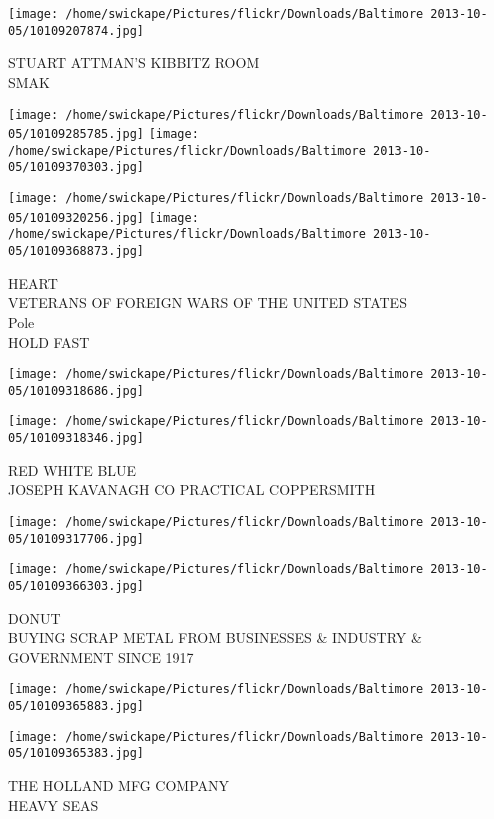 \documentclass[10pt,letterpaper]{article}
\begin{document}
\vspace{0.25in}
\texttt{[image: /home/swickape/Pictures/flickr/Downloads/Baltimore 2013-10-05/10109207874.jpg]}

STUART ATTMAN'S KIBBITZ ROOM\\
SMAK
\pagebreak

\texttt{[image: /home/swickape/Pictures/flickr/Downloads/Baltimore 2013-10-05/10109285785.jpg]}
\texttt{[image: /home/swickape/Pictures/flickr/Downloads/Baltimore 2013-10-05/10109370303.jpg]}

\texttt{[image: /home/swickape/Pictures/flickr/Downloads/Baltimore 2013-10-05/10109320256.jpg]}
\texttt{[image: /home/swickape/Pictures/flickr/Downloads/Baltimore 2013-10-05/10109368873.jpg]}

HEART\\
VETERANS OF FOREIGN WARS OF THE UNITED STATES\\
Pole\\
HOLD FAST
\pagebreak

\texttt{[image: /home/swickape/Pictures/flickr/Downloads/Baltimore 2013-10-05/10109318686.jpg]}

\vspace{0.25in}
\texttt{[image: /home/swickape/Pictures/flickr/Downloads/Baltimore 2013-10-05/10109318346.jpg]}

RED WHITE BLUE\\
JOSEPH KAVANAGH CO PRACTICAL COPPERSMITH
\pagebreak

\texttt{[image: /home/swickape/Pictures/flickr/Downloads/Baltimore 2013-10-05/10109317706.jpg]}

\vspace{0.25in}
\texttt{[image: /home/swickape/Pictures/flickr/Downloads/Baltimore 2013-10-05/10109366303.jpg]}

DONUT\\
BUYING SCRAP METAL FROM BUSINESSES \& INDUSTRY \& GOVERNMENT SINCE 1917
\pagebreak

\texttt{[image: /home/swickape/Pictures/flickr/Downloads/Baltimore 2013-10-05/10109365883.jpg]}

\vspace{0.25in}
\texttt{[image: /home/swickape/Pictures/flickr/Downloads/Baltimore 2013-10-05/10109365383.jpg]}

THE HOLLAND MFG COMPANY\\
HEAVY SEAS
\pagebreak
\end{document}
